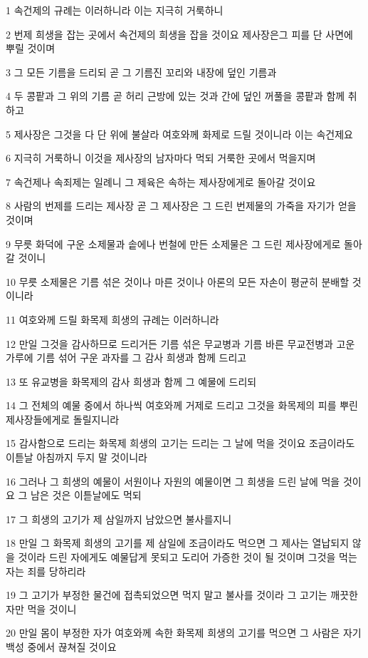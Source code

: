 \par 1 속건제의 규례는 이러하니라 이는 지극히 거룩하니
\par 2 번제 희생을 잡는 곳에서 속건제의 희생을 잡을 것이요 제사장은그 피를 단 사면에 뿌릴 것이며
\par 3 그 모든 기름을 드리되 곧 그 기름진 꼬리와 내장에 덮인 기름과
\par 4 두 콩팥과 그 위의 기름 곧 허리 근방에 있는 것과 간에 덮인 꺼풀을 콩팥과 함께 취하고
\par 5 제사장은 그것을 다 단 위에 불살라 여호와께 화제로 드릴 것이니라 이는 속건제요
\par 6 지극히 거룩하니 이것을 제사장의 남자마다 먹되 거룩한 곳에서 먹을지며
\par 7 속건제나 속죄제는 일례니 그 제육은 속하는 제사장에게로 돌아갈 것이요
\par 8 사람의 번제를 드리는 제사장 곧 그 제사장은 그 드린 번제물의 가죽을 자기가 얻을 것이며
\par 9 무릇 화덕에 구운 소제물과 솥에나 번철에 만든 소제물은 그 드린 제사장에게로 돌아갈 것이니
\par 10 무릇 소제물은 기름 섞은 것이나 마른 것이나 아론의 모든 자손이 평균히 분배할 것이니라
\par 11 여호와께 드릴 화목제 희생의 규례는 이러하니라
\par 12 만일 그것을 감사하므로 드리거든 기름 섞은 무교병과 기름 바른 무교전병과 고운 가루에 기름 섞어 구운 과자를 그 감사 희생과 함께 드리고
\par 13 또 유교병을 화목제의 감사 희생과 함께 그 예물에 드리되
\par 14 그 전체의 예물 중에서 하나씩 여호와께 거제로 드리고 그것을 화목제의 피를 뿌린 제사장들에게로 돌릴지니라
\par 15 감사함으로 드리는 화목제 희생의 고기는 드리는 그 날에 먹을 것이요 조금이라도 이튿날 아침까지 두지 말 것이니라
\par 16 그러나 그 희생의 예물이 서원이나 자원의 예물이면 그 희생을 드린 날에 먹을 것이요 그 남은 것은 이튿날에도 먹되
\par 17 그 희생의 고기가 제 삼일까지 남았으면 불사를지니
\par 18 만일 그 화목제 희생의 고기를 제 삼일에 조금이라도 먹으면 그 제사는 열납되지 않을 것이라 드린 자에게도 예물답게 못되고 도리어 가증한 것이 될 것이며 그것을 먹는 자는 죄를 당하리라
\par 19 그 고기가 부정한 물건에 접촉되었으면 먹지 말고 불사를 것이라 그 고기는 깨끗한 자만 먹을 것이니
\par 20 만일 몸이 부정한 자가 여호와께 속한 화목제 희생의 고기를 먹으면 그 사람은 자기 백성 중에서 끊쳐질 것이요
